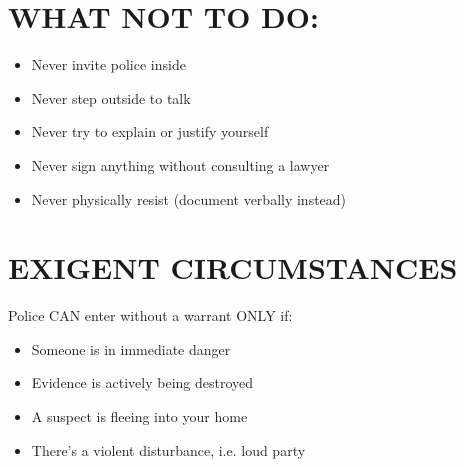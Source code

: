 \documentclass[10pt,letterpaper,twocolumn]{article}
\begin{document}
\section{WHAT NOT TO DO:}

\begin{itemize}[leftmargin=*]
    \item[{\texttimes}] Never invite police inside
    \item[{\texttimes}] Never step outside to talk
    \item[{\texttimes}] Never try to explain or justify yourself
    \item[{\texttimes}] Never sign anything without consulting a lawyer
    \item[{\texttimes}] Never physically resist (document verbally instead)
\end{itemize}

\section{EXIGENT CIRCUMSTANCES}

Police CAN enter without a warrant ONLY if:
\begin{itemize}[leftmargin=*]
    \item Someone is in immediate danger
    \item Evidence is actively being destroyed
    \item A suspect is fleeing into your home
    \item There's a violent disturbance, i.e. loud party
\end{itemize}
\end{document}
